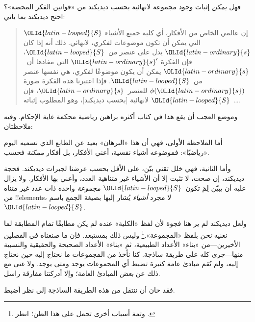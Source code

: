 \documentclass[../../../include/open-logic-section]{subfiles}
\begin{document}
فهل \emph{يمكن} إثبات وجود مجموعة لانهائية بحسب ديديكند من «قوانين الفكر المحضة»؟ احتج ديديكند بما يأتي:
\begin{quote}
  إن عالمي الخاص من الأفكار، أي كلية جميع الأشياء ${\OLId{latin-looped}{S}}$ التي يمكن أن
  تكون موضوعات لفكري، لانهائي. ذلك أنه إذا كان ${\OLId{latin-ordinary}{s}}$ يدل على عنصر
  من~${\OLId{latin-looped}{S}}$، فإن الفكرة ${\OLId{latin-ordinary}{s}}'$ التي مفادها أن~${\OLId{latin-ordinary}{s}}$ يمكن أن يكون موضوعًا
  لفكري، هي نفسها عنصر من~${\OLId{latin-looped}{S}}$. فإذا اعتبرنا هذه الفكرة صورة
  $\phi({\OLId{latin-ordinary}{s}})$ للعنصر~${\OLId{latin-ordinary}{s}}$، فإن \dots~${\OLId{latin-looped}{S}}$ لانهائية [بحسب ديديكند]، وهو
  المطلوب إثباته.
	\citep[\S66]{Dedekind1888}
\end{quote}
وموضع العجب أن يقع هذا في كتاب أكثره براهين رياضية محكمة غاية الإحكام. وفيه ملاحظتان:

أما الملاحظة الأولى، فهي أن هذا «البرهان» بعيد عن الطابع الذي نسميه اليوم «رياضيًا»: فموضوعه أشياء نفسية، أعني الأفكار، بل أفكار
\emph{ممكنة} فحسب.

وأما الثانية، فهي خلل تقني بيّن، على الأقل بحسب عرضنا لجبرات ديديكند. فحجة ديديكند، إن صحت، لا تثبت إلا أن الأشياء غير متناهية العدد، وأعني بها الأفكار. ولا يزال عليه أن يبيّن لِمَ تكون~${\OLId{latin-looped}{S}}$
\emph{مجموعة} واحدة ذات عدد غير متناه من
!!{element}s، لا مجرد \emph{أشياء} يُشار إليها بصيغة الجمع باسم~${\OLId{latin-looped}{S}}$.

ولعل ديديكند لم ير هنا فجوة لأن لفظ «الكلية» عنده لم يكن مطابقًا تمام المطابقة لما نعنيه \emph{نحن} بلفظ «المجموعة».\footnote{وثمة أسباب أخرى تحمل على هذا الظن؛ انظر
\citet[ص~23]{Potter2004}.} وليس ذلك بمستبعد. فإن ما صنعناه في الفصلين الأخيرين---من «بناء» الأعداد الطبيعية، ثم «بناء» الأعداد الصحيحة والحقيقية والنسبية منها---جرى كله على طريقة ساذجة. كنا نأخذ من المجموعات ما نحتاج إليه حين نحتاج إليه، ولم نُقم مبادئ عامة كثيرة تضبط أي المجموعات يوجد ومتى يوجد. ولا غنى مع ذلك عن \emph{بعض} المبادئ العامة؛ وإلا أدركتنا مفارقة راسل.

فقد حان أن ننتقل من هذه الطريقة الساذجة إلى نظر أضبط.
\end{document}
